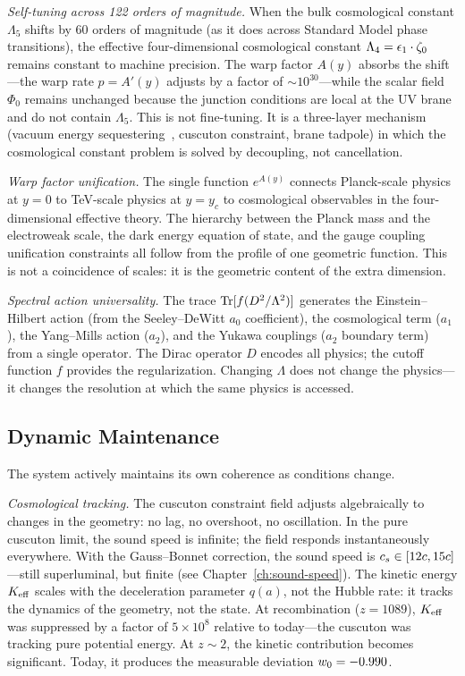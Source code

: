 \textit{Self-tuning across 122 orders of magnitude.} When the bulk
cosmological constant $\Lambda_5$ shifts by 60 orders of magnitude
(as it does across Standard Model phase transitions), the effective
four-dimensional cosmological constant
$\Lambda_4 = \epsilon_1 \cdot \zeta_0$ remains constant to machine precision.
The warp factor $A(y)$ absorbs the shift---the warp rate
$p = A'(y)$ adjusts by a factor of $\sim 10^{30}$---while the scalar
field $\Phi_0$ remains unchanged because the junction conditions are
local at the UV brane and do not contain $\Lambda_5$. This is not
fine-tuning. It is a three-layer mechanism (vacuum energy
sequestering~\cite{ch1:kaloper14}, cuscuton constraint, brane tadpole)
in which the cosmological constant problem is solved by decoupling,
not cancellation.

\textit{Warp factor unification.} The single function $e^{A(y)}$
connects Planck-scale physics at $y = 0$ to TeV-scale physics at
$y = y_c$ to cosmological observables in the four-dimensional effective
theory. The hierarchy between the Planck mass and the electroweak
scale, the dark energy equation of state, and the gauge coupling
unification constraints all follow from the profile of one geometric
function. This is not a coincidence of scales: it is the geometric
content of the extra dimension.

\textit{Spectral action universality.} The trace
$\operatorname{Tr}[f(D^2/\Lambda^2)]$ generates the Einstein--Hilbert action (from
the Seeley--DeWitt $a_0$ coefficient), the cosmological term ($a_1$),
the Yang--Mills action ($a_2$), and the Yukawa couplings ($a_2$
boundary term) from a single operator. The Dirac operator $D$ encodes
all physics; the cutoff function $f$ provides the regularization.
Changing $\Lambda$ does not change the physics---it changes the
resolution at which the same physics is accessed.

\subsection{Dynamic Maintenance}
\label{sec:0-dynamic}

The system actively maintains its own coherence as conditions change.

\textit{Cosmological tracking.} The cuscuton constraint field adjusts
algebraically to changes in the geometry: no lag, no overshoot, no
oscillation. In the pure cuscuton limit, the sound speed is infinite;
the field responds instantaneously everywhere. With the Gauss--Bonnet
correction, the sound speed is $c_s \in [12c, 15c]$---still
superluminal, but finite (see Chapter~\ref{ch:sound-speed}). The
kinetic energy $K_{\mathrm{eff}}$ scales with the deceleration parameter $q(a)$,
not the Hubble rate: it tracks the dynamics of the geometry, not the
state. At recombination ($z = 1089$), $K_{\mathrm{eff}}$ was suppressed by a
factor of $5 \times 10^8$ relative to today---the cuscuton was tracking
pure potential energy. At $z \sim 2$, the kinetic contribution becomes
significant. Today, it produces the measurable deviation
$w_0 = -0.990$.

